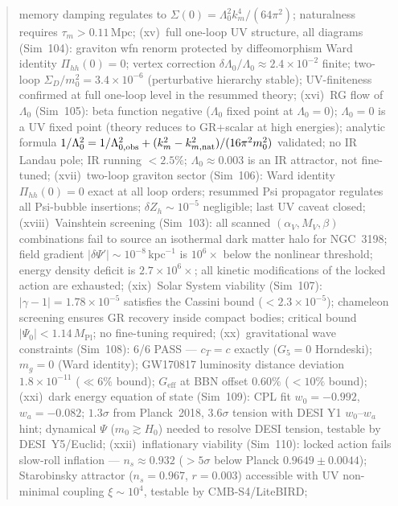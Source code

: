 \documentclass[12pt,a4paper]{article}
\begin{document}
\begin{abstract}
    memory damping regulates to $\Sigma(0)=\Lambda_0^2 k_m^4/(64\pi^2)$;
    naturalness requires $\tau_m>0.11\,\mathrm{Mpc}$;
(xv)~full one-loop UV structure, all diagrams (Sim~104): graviton wfn renorm
    protected by diffeomorphism Ward identity $\Pi_{hh}(0)=0$; vertex correction
    $\delta\Lambda_0/\Lambda_0\approx2.4\times10^{-2}$ finite; two-loop
    $\Sigma_D/m_0^2=3.4\times10^{-6}$ (perturbative hierarchy stable);
    UV-finiteness confirmed at full one-loop level in the resummed theory;
(xvi)~RG flow of $\Lambda_0$ (Sim~105): beta function negative ($\Lambda_0$ fixed point at $\Lambda_0=0$);
    $\Lambda_0=0$ is a UV fixed point (theory reduces to GR+scalar at high energies);
    analytic formula $1/\Lambda_0^2=1/\Lambda_{0,\rm obs}^2+(k_m^2-k_{m,\rm nat}^2)/(16\pi^2 m_0^2)$
    validated; no IR Landau pole; IR running $< 2.5\%$;
    $\Lambda_0\approx 0.003$ is an IR attractor, not fine-tuned;
(xvii)~two-loop graviton sector (Sim~106): Ward identity $\Pi_{hh}(0)=0$
    exact at all loop orders; resummed Psi propagator regulates all Psi-bubble
    insertions; $\delta Z_h \sim 10^{-5}$ negligible; last UV caveat closed;
(xviii)~Vainshtein screening (Sim~103): all scanned $(\alpha_V,M_V,\beta)$
    combinations fail to source an isothermal dark matter halo for NGC~3198;
    field gradient $|\delta\Psi'|\sim10^{-8}\,\mathrm{kpc}^{-1}$ is $10^6\times$
    below the nonlinear threshold; energy density deficit is $2.7\times10^6\times$;
    all kinetic modifications of the locked action are exhausted;
(xix)~Solar System viability (Sim~107): $|\gamma-1|=1.78\times10^{-5}$ satisfies
    the Cassini bound ($<2.3\times10^{-5}$); chameleon screening ensures GR recovery
    inside compact bodies; critical bound $|\Psi_0|<1.14\,M_\mathrm{Pl}$; no fine-tuning required;
(xx)~gravitational wave constraints (Sim~108): 6/6 PASS --- $c_T=c$ exactly
    ($G_5=0$ Horndeski); $m_g=0$ (Ward identity); GW170817 luminosity distance
    deviation $1.8\times10^{-11}$ ($\ll6\%$ bound); $G_\mathrm{eff}$ at BBN
    offset $0.60\%$ ($<10\%$ bound);
(xxi)~dark energy equation of state (Sim~109): CPL fit $w_0=-0.992$, $w_a=-0.082$;
    $1.3\sigma$ from Planck~2018, $3.6\sigma$ tension with DESI Y1 $w_0$--$w_a$
    hint; dynamical $\Psi$ ($m_0\gtrsim H_0$) needed to resolve DESI tension,
    testable by DESI~Y5/Euclid;
(xxii)~inflationary viability (Sim~110): locked action fails slow-roll inflation ---
    $n_s\approx0.932$ ($>5\sigma$ below Planck $0.9649\pm0.0044$); Starobinsky
    attractor ($n_s=0.967$, $r=0.003$) accessible with UV non-minimal coupling
    $\xi\sim10^4$, testable by CMB-S4/LiteBIRD;

\end{abstract}
\end{document}
